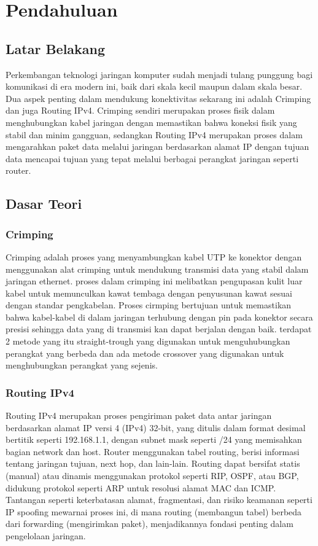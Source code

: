 \section{Pendahuluan}
\subsection{Latar Belakang}
Perkembangan teknologi jaringan komputer sudah menjadi tulang punggung bagi komunikasi di era modern ini, baik dari skala kecil maupun dalam skala besar. Dua aspek penting dalam mendukung konektivitas sekarang ini adalah Crimping dan juga Routing IPv4. Crimping sendiri merupakan proses fisik dalam menghubungkan kabel jaringan dengan memastikan bahwa koneksi fisik yang stabil dan minim gangguan, sedangkan Routing IPv4 merupakan proses dalam mengarahkan paket data melalui jaringan berdasarkan alamat IP dengan tujuan data mencapai tujuan yang tepat melalui berbagai perangkat jaringan seperti router.

\subsection{Dasar Teori}
\subsubsection{Crimping}
Crimping adalah proses yang menyambungkan kabel UTP ke konektor dengan menggunakan alat crimping untuk mendukung transmisi data yang stabil dalam jaringan ethernet. proses dalam crimping ini melibatkan pengupasan kulit luar kabel untuk memunculkan kawat tembaga dengan penyusunan kawat sesuai dengan standar pengkabelan. Proses cirmping bertujuan untuk memastikan bahwa kabel-kabel di dalam jaringan  terhubung dengan pin pada konektor secara presisi sehingga data yang di transmisi kan dapat berjalan dengan baik. terdapat 2 metode yang itu straight-trough yang digunakan untuk menguhubungkan perangkat yang berbeda dan ada metode crossover yang digunakan untuk menghubungkan perangkat yang sejenis.

\subsubsection{Routing IPv4}
Routing IPv4 merupakan proses pengiriman paket data antar jaringan berdasarkan alamat IP versi 4 (IPv4) 32-bit, yang ditulis dalam format desimal bertitik seperti 192.168.1.1, dengan subnet mask seperti /24 yang memisahkan bagian network dan host. Router menggunakan tabel routing, berisi informasi tentang jaringan tujuan, next hop, dan lain-lain. Routing dapat bersifat statis (manual) atau dinamis menggunakan protokol seperti RIP, OSPF, atau BGP, didukung protokol seperti ARP untuk resolusi alamat MAC dan ICMP. Tantangan seperti keterbatasan alamat, fragmentasi, dan risiko keamanan seperti IP spoofing mewarnai proses ini, di mana routing (membangun tabel) berbeda dari forwarding (mengirimkan paket), menjadikannya fondasi penting dalam pengelolaan jaringan.
